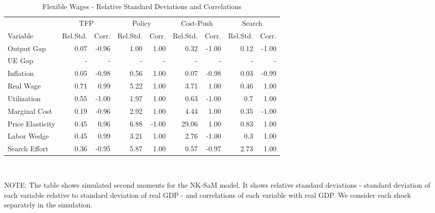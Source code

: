 \documentclass[12pt,3p,authoryear,review]{elsarticle}
\begin{document}
\begin{table}[h!]%
	\begin{center}%
		\begin{footnotesize}%
			\caption{Flexible Wages - Relative Standard Deviations and Correlations}\label{tab:app_robust_sw}%
			\begin{tabular}{l r r r r r r r r}%
				\hline%
				& \multicolumn{2}{c}{TFP} & \multicolumn{2}{c}{Policy} & \multicolumn{2}{c}{Cost-Push} & \multicolumn{2}{c}{Search}\\%
				Variable & Rel.Std. & Corr. & Rel.Std. & Corr. & Rel.Std. & Corr. & Rel.Std. & Corr.\\%
				\hline \hline%
				Output Gap & 0.07 & -0.96 & 1.00 & 1.00 & 0.32 & -1.00 & 0.12 & -1.00\\%
				UE Gap & - & - & - & - & - & - & - & -\\%
				Inflation & 0.05 & -0.98 & 0.56 & 1.00 & 0.07 & -0.98 & 0.03 & -0.99\\%
				Real Wage & 0.71 & 0.99 & 5.22 & 1.00 & 3.71 & 1.00 & 0.46 & 1.00\\%
				Utilization & 0.55 & -1.00 & 1.97 & 1.00 & 0.63 & -1.00 & 0.7 & 1.00\\%
				Marginal Cost & 0.19 & -0.96 & 2.92 & 1.00 & 4.44 & 1.00 & 0.35 & -1.00\\%
				Price Elasticity & 0.45 & 0.96 & 6.88 & -1.00 & 29.06 & 1.00 & 0.83 & 1.00\\%
				Labor Wedge & 0.45 & 0.99 & 3.21 & 1.00 & 2.76 & -1.00 & 0.3 & 1.00\\%
				Search Effort & 0.36 & -0.95 & 5.87 & 1.00 & 0.57 & -0.97 & 2.73 & 1.00\\%
				\hline%
			\end{tabular}\\%
			\vspace{0.1in}%
			{\tiny NOTE: The table shows simulated second moments for the NK-SaM model. It shows relative standard deviations - standard deviation of each variable relative to standard deviation of real GDP - and correlations of each variable with real GDP. We consider each shock separately in the simulation.\par}%
		\end{footnotesize}%
	\end{center}%
\end{table}%
\end{document}
